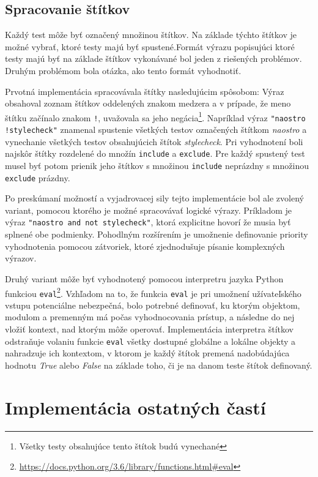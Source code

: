 \documentclass[
  digital, %
  twoside, %
  table,   %
  lof,     %
  lot,     %
]{fithesis3}
\newcommand*{\footurl}[1]{\footnote{\url{#1}}}
\begin{document}
\subsection{Spracovanie štítkov}

Každý test môže byť označený množinou štítkov. Na základe týchto štítkov je možné vybrať, ktoré testy majú byť spustené.Formát výrazu popisujúci ktoré testy majú byť na základe štítkov vykonávané bol jeden z riešených problémov. Druhým problémom bola otázka, ako tento formát vyhodnotiť. 

Prvotná implementácia spracovávala štítky nasledujúcim spôsobom: Výraz obsahoval zoznam štítkov oddelených znakom medzera a v prípade, že meno štítku začínalo znakom \texttt{!}, uvažovala sa jeho negácia\footnote{Všetky testy obsahujúce tento štítok budú vynechané}. Napríklad výraz \texttt{"naostro !stylecheck"} znamenal spustenie všetkých testov označených štítkom \emph{naostro} a vynechanie všetkých testov obsahujúcich štítok \emph{stylecheck}. Pri vyhodnotení boli najskôr štítky rozdelené do množín \texttt{include} a \texttt{exclude}. Pre každý spustený test musel byť potom prienik jeho štítkov s množinou \texttt{include} neprázdny s množinou \texttt{exclude} prázdny.

Po preskúmaní možností a vyjadrovacej sily tejto implementácie bol ale zvolený variant, pomocou ktorého je možné spracovávať logické výrazy. Príkladom je výraz \texttt{"naostro and not stylecheck"}, ktorá explicitne hovorí že musia byť splnené obe podmienky. Pohodlným rozšírením je umožnenie definovanie priority vyhodnotenia pomocou zátvoriek, ktoré zjednodušuje písanie komplexných výrazov.

Druhý variant môže byť vyhodnotený pomocou interpretru jazyka Python funkciou \texttt{eval}\footurl{https://docs.python.org/3.6/library/functions.html\#eval}. Vzhľadom na to, že funkcia \texttt{eval} je pri umožnení užívateľského vstupu potenciálne nebezpečná, bolo potrebné definovať, ku ktorým objektom, modulom a premenným má počas vyhodnocovania prístup, a následne do nej vložiť kontext, nad ktorým môže operovať. Implementácia interpretra štítkov odstraňuje volaniu funkcie \texttt{eval} všetky dostupné globálne a lokálne objekty a nahradzuje ich kontextom, v ktorom je každý štítok premená nadobúdajúca hodnotu \emph{True} alebo \emph{False} na základe toho, či je na danom teste štítok definovaný. 

\section{Implementácia ostatných častí}
\end{document}

